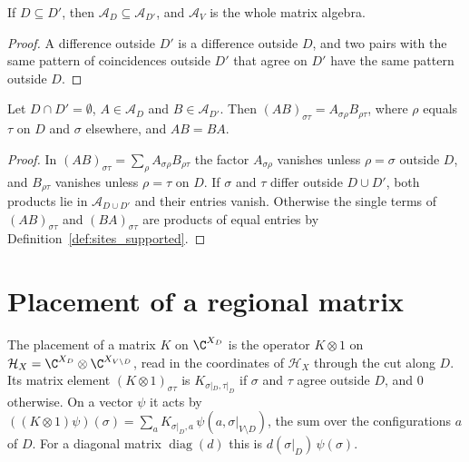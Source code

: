 \begin{lemma}
    \label{lem:sites_supported_mono}
    \leanok
    If $D\subseteq D'$, then $\mathcal A_D\subseteq\mathcal A_{D'}$, and
    $\mathcal A_V$ is the whole matrix algebra.
\end{lemma}
\begin{proof}\leanok
    A difference outside $D'$ is a difference outside $D$, and two pairs with
    the same pattern of coincidences outside $D'$ that agree on $D'$ have the
    same pattern outside $D$.
\end{proof}

\begin{lemma}
    \label{lem:sites_supported_commute}
    \leanok
    Let $D\cap D'=\emptyset$, $A\in\mathcal A_D$ and $B\in\mathcal A_{D'}$.
    Then $(AB)_{\sigma\tau}=A_{\sigma\rho}B_{\rho\tau}$, where $\rho$ equals
    $\tau$ on $D$ and $\sigma$ elsewhere, and $AB=BA$.
\end{lemma}
\begin{proof}\leanok
    In $(AB)_{\sigma\tau}=\sum_{\rho}A_{\sigma\rho}B_{\rho\tau}$ the factor
    $A_{\sigma\rho}$ vanishes unless $\rho=\sigma$ outside $D$, and
    $B_{\rho\tau}$ vanishes unless $\rho=\tau$ on $D$. If $\sigma$ and $\tau$
    differ outside $D\cup D'$, both products lie in $\mathcal A_{D\cup D'}$ and
    their entries vanish. Otherwise the single terms of $(AB)_{\sigma\tau}$ and
    $(BA)_{\sigma\tau}$ are products of equal entries by
    Definition~\ref{def:sites_supported}.
\end{proof}

\section{Placement of a regional matrix}
\label{sec:sites_place}

\begin{definition}[Placement]
    \label{def:sites_place}
    \leanok
    The placement of a matrix $K$ on $\C^{X_D}$ is the operator $K\otimes1$ on
    $\mathcal H_X=\C^{X_D}\otimes\C^{X_{V\setminus D}}$, read in the
    coordinates of $\mathcal H_X$ through the cut along $D$. Its matrix element
    $(K\otimes1)_{\sigma\tau}$ is $K_{\sigma|_D,\tau|_D}$ if $\sigma$ and $\tau$
    agree outside $D$, and $0$ otherwise. On a vector $\psi$ it acts by
    $((K\otimes1)\psi)(\sigma)=\sum_aK_{\sigma|_D,a}\,\psi(a,\sigma|_{V\setminus D})$,
    the sum over the configurations $a$ of $D$. For a diagonal matrix
    $\operatorname{diag}(d)$ this is $d(\sigma|_D)\,\psi(\sigma)$.
\end{definition}

